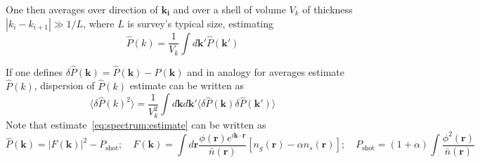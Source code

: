\documentclass[12pt]{extarticle}
\numberwithin{problem}{section}
\numberwithin{theorem}{section}
\begin{document}
	One then averages over direction of $\mathbf{k_i}$ and over a shell of volume $V_k$ of thickness $|k_i - k_{i + 1}|\gg 1/L$, where $L$ is survey's typical size, estimating
	\begin{equation}
		\hat{P}(k) = \frac{1}{V_k}\int d\mathbf{k}' \hat{P}(\mathbf{k}')
	\end{equation}

	If one defines $\delta \hat{P}(\mathbf{k}) = \hat{P}(\mathbf{k}) - P(\mathbf{k})$ and in analogy for averages estimate $\hat{P}(k)$, dispersion of $\hat{P}(k)$ estimate can be written as
	\begin{equation}
		\langle\delta \hat{P}(k)^2\rangle = \frac{1}{V_k^2}\int d\mathbf{k}d\mathbf{k}' \langle\delta \hat{P}(\mathbf{k})\delta \hat{P}(\mathbf{k}')\rangle
	\end{equation}
	Note that estimate~\ref{eq:spectrum:estimate} can be written as
	\begin{equation}
		\hat{P}(\mathbf{k}) = |F(\mathbf{k})|^2 - P_{\text{shot}};\quad F(\mathbf{k}) = \int d\mathbf{r} \frac{\phi(\mathbf{r})e^{i\mathbf{k}\cdot\mathbf{r}}}{\bar{n}(\mathbf{r})}[n_g(\mathbf{r}) - \alpha n_s(\mathbf{r})];\quad P_{\text{shot}} = (1 + \alpha)\int \frac{\phi^2(\mathbf{r})}{\bar{n}(\mathbf{r})}
	\end{equation}
\end{document}
